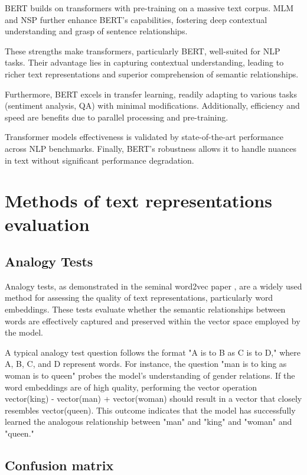 BERT builds on transformers with pre-training on a massive text corpus.
\ac{MLM} and \ac{NSP} further enhance \ac{BERT}'s capabilities, fostering deep contextual understanding and grasp of sentence relationships.

These strengths make transformers, particularly \ac{BERT}, well-suited for \ac{NLP} tasks.
Their advantage lies in capturing contextual understanding, leading to richer text representations and superior comprehension of semantic relationships.

Furthermore, \ac{BERT} excels in transfer learning, readily adapting to various tasks (sentiment analysis, \ac{QA}) with minimal modifications.
Additionally, efficiency and speed are benefits due to parallel processing and pre-training.

Transformer models effectiveness is validated by state-of-the-art performance across \ac{NLP} benchmarks.
Finally, \ac{BERT}'s robustness allows it to handle nuances in text without significant performance degradation.

\section{Methods of text representations evaluation}

\subsection{Analogy Tests}

Analogy tests, as demonstrated in the seminal word2vec paper \cite{word2vec}, are a widely used method for assessing the quality of text representations, particularly word embeddings.
These tests evaluate whether the semantic relationships between words are effectively captured and preserved within the vector space employed by the model.

A typical analogy test question follows the format "A is to B as C is to D," where A, B, C, and D represent words.
For instance, the question "man is to king as woman is to queen" probes the model's understanding of gender relations.
If the word embeddings are of high quality, performing the vector operation vector(king) - vector(man) + vector(woman) should result in a vector that closely resembles vector(queen).
This outcome indicates that the model has successfully learned the analogous relationship between "man" and "king" and "woman" and "queen."

\subsection{Confusion matrix}

